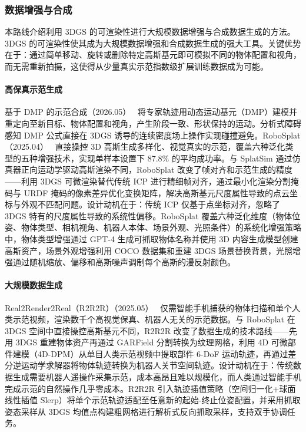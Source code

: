 \subsubsection{数据增强与合成}

本路线介绍利用 3DGS 的可渲染性进行大规模数据增强与合成数据生成的方法。3DGS 的可渲染性使其成为大规模数据增强和合成数据生成的强大工具。关键优势在于：通过简单移动、旋转或删除特定高斯基元即可模拟不同的物体配置和视角，而无需重新拍摄，这使得从少量真实示范指数级扩展训练数据成为可能。

\paragraph{高保真示范生成}

基于 DMP 的示范合成（2026.05）~\cite{2605_01232} 将专家轨迹用动态运动基元（DMP）建模并重定向至新目标、物体配置和视角，产生阶段一致、形状保持的运动。分析式障碍感知 DMP 公式直接在 3DGS 诱导的连续密度场上操作实现碰撞避免。RoboSplat（2025.04）~\cite{2504_13175} 直接操控 3D 高斯生成多样化、视觉真实的示范，覆盖六种泛化类型的五种增强技术，实现单样本设置下 87.8\% 的平均成功率。与 SplatSim 通过仿真器正向运动学驱动高斯渲染不同，RoboSplat 改变了帧对齐和示范生成的精度——利用 3DGS 可微渲染替代传统 ICP 进行精细帧对齐，通过最小化渲染分割掩码与 URDF 掩码的像素差异优化变换矩阵，解决高斯基元尺度属性导致的点云坐标与外观不匹配问题。设计动机在于：传统 ICP 仅基于点坐标对齐，忽略了 3DGS 特有的尺度属性导致的系统性偏移。RoboSplat 覆盖六种泛化维度（物体位姿、物体类型、相机视角、机器人本体、场景外观、光照条件）的系统化增强策略中，物体类型增强通过 GPT-4 生成可抓取物体名称并使用 3D 内容生成模型创建高斯资产，场景外观增强利用 COCO 数据集和重建 3DGS 场景替换背景，光照增强通过随机缩放、偏移和高斯噪声调制每个高斯的漫反射颜色。

\paragraph{大规模数据生成}

Real2Render2Real（R2R2R）（2025.05）~\cite{2505_09601} 仅需智能手机捕获的物体扫描和单个人类示范视频，渲染数千个高视觉保真、机器人无关的示范数据。与 RoboSplat 在 3DGS 空间中直接操控高斯基元不同，R2R2R 改变了数据生成的技术路线——先用 3DGS 重建物体资产再通过 GARField 分割转换为纹理网格，利用 4D 可微部件建模（4D-DPM）从单目人类示范视频中提取部件 6-DoF 运动轨迹，再通过差分逆运动学求解器将物体轨迹转换为机器人关节空间轨迹。设计动机在于：传统数据生成需要机器人遥操作采集示范，成本高昂且难以规模化，而人类通过智能手机完成示范的自然操作几乎零成本。R2R2R 引入轨迹插值策略（空间归一化+球面线性插值 Slerp）将单个示范轨迹适配至任意新的起始-终止位姿配置，并采用抓取姿态采样从 3DGS 均值点构建粗网格进行解析式反向抓取采样，支持双手协调任务。


